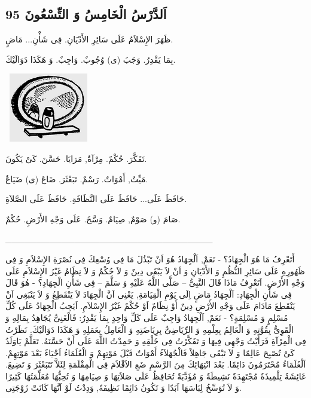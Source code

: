 \documentclass[a5paper]{article}
\begin{document}
\subsection{اَلدَّرْسُ الْخَامِسُ وَ التِّسْعُونَ 95}
ظَهَرَ الإِسْلاَمُ عَلَى سَائِرِ الأَدْيَانِ. فِى شَأْنِ... مَاضٍ.

بِمَا يَقْدِرُ. وَجَبَ (ى) وُجُوبٌ. وَاجِبٌ. وَ هَكَذَا دَوَالَيْكَ. 

\  \includegraphics[width=1.3543in,height=1.1874in]{MuhammadBagauddinlatinized-img268.png} 

تَفَكَّرَ. حُكْمٌ. مِرْآةٌ, مَرَايَا. حَسَّنَ. كَىْ يَكُونَ. 

مَيِّتٌ, أَمْوَاتٌ. رَسْمٌ. تَبَعْثَرَ. ضَاعَ (ى) ضَيَاعٌ.

حَافَظَ عَلَى... حَافَظَ عَلَى النَّظَافَةِ. حَافَظَ عَلَى الصَّلاَةِ. 

صَامَ (و) صَوْمٌ, صِيَامٌ. وَسَّخَ. عَلَى وَجْهِ الأَرْضِ. حُكْمٌ.

\_\_\_\_\_\_\_\_\_\_\_\_\_\_\_\_\_\_\_\_\_\_\_\_\_\_\_\_\_\_\_\_\_

أَتَعْرِفُ مَا هُوَ الْجِهَادُ؟ - نَعَمْ, اَلْجِهَادُ هُوَ اَنْ تَبْذُلَ مَا فِى وُسْعِكَ فِى نُصْرَةِ الإِسْلاَمِ وَ فِى ظَهُورِهِ عَلَى سَائِرِ النُّظُمِ وَ الأَدْيَانِ وَ اَنْ لاَ يَبْقَى دِينٌ وَ لاَ حُكْمٌ وَ لاَ نِظَامٌ غَيْرُ الإِسْلاَمِ عَلَى وَجْهِ الأَرْضِ. اَتَعْرِفُ مَاذَا قَالَ النَّبِىُّ – صَلَّى اللَّهُ عَلَيْهِ وَ سَلَّمَ – فِى شَأْنِ الْجِهَادِ؟ - هُوَ قَالَ فِى شَأْنِ الْجِهَادِ: اَلْجِهَادُ مَاضٍ اِلَى يَوْمِ الْقِيَامَةِ, يَعْنِى اَنَّ الْجِهَادَ لاَ يَنْقَطِعُ وَ لاَ يَنْبَغِى اَنْ يَنْقَطِعَ مَادَامَ عَلَى وَجْهِ الأَرْضِ دِينٌ أَوْ نِظَامٌ اَوْ حُكْمٌ غَيْرُ الإِسْلاَمِ. اَيَجِبُ الْجِهَادُ عَلَى كُلِّ مُسْلِمٍ وَ مُسْلِمَةٍ؟ - نَعَمْ, اَلْجِهَادُ وَاجِبٌ عَلَى كَلِّ وَاحِدٍ بِمَا يَقْدِرُ: فَالْغَنِىُّ يُجَاهِدُ بِمَالِهِ وَ الْقَوِىُّ بِقُوَّتِهِ وَ الْعَالِمُ بِعِلْمِهِ وَ الرِّيَاضِىُّ بِرِيَاضَتِهِ وَ الْعَامِلُ بِعَمَلِهِ وَ هَكَذَا دَوَالَيْكَ. نَظَرْتُ فِى الْمِرْآةِ فَرَأَيْتُ وَجْهِى فِيهَا وَ تَفَكَّرْتُ فِى خَلْقِهِ وَ حَمِدْتُ اللَّهَ عَلَى أَنْ حَسَّنَهُ. تَعَلَّمْ يَاوَلَدُ كَىْ تُصْبِحَ عَالِمًا وَ لاَ تَبْقَى جَاهِلاً فَالْجُهَلاَءُ أَمْوَاتٌ قَبْلَ مَوْتِهِمْ وَ الْعُلَمَاءُ اَحْيَاءٌ بَعْدَ مَوْتِهِمْ. اَلْعُلَمَاءُ مُحْتَرَمُونَ دَائِمًا. بَعْدَ انْتِهَائِكَ مِنَ الرَّسْمِ ضَعِ الاَقْلاَمَ فِى الْمِقْلَمَةِ لِئَلاَّ تَتَبَعْثَرَ وَ تَضِيعَ. عَائِشَةُ تِلْمِيذَةٌ مُجْتَهِدَةٌ نَشِيطَةٌ وَ مُؤَدَّبَةٌ تُحَافِظُ عَلَى صَلاَتِهَا وَ صِيَامِهَا وَ تُحِبُّهَا مُعَلِّمَتُهَا كَثِيرًا وَ لاَ تُوَسِّخُ لِبَاسَهَا اَبَدًا وَ تَكُونُ دَائِمًا نَظِيفَةً, وَدِدْتُ لَوْ اَنَّهَا كَانَتْ زَوْجَتِى.
\end{document}
